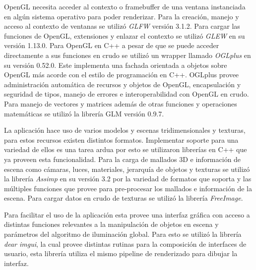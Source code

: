 OpenGL necesita acceder al contexto o framebuffer de una ventana instanciada en algún sistema operativo para poder renderizar. Para la creación, manejo y acceso al contexto de ventanas se utilizó \emph{GLFW} versión 3.1.2. Para cargar las funciones de OpenGL, extensiones y enlazar el contexto se utilizó \emph{GLEW} en su versión 1.13.0. Para OpenGL en C++ a pesar de que se puede acceder directamente a sus funciones en crudo se utilizó un wrapper llamado \emph{OGLplus} en su versión 0.52.0. Este implementa una fachada orientada a objetos sobre OpenGL más acorde con el estilo de programación en C++. OGLplus provee administración automática de recursos y objetos de OpenGL, encapsulación y seguridad de tipos, manejo de errores e interoperabilidad con OpenGL en crudo. Para manejo de vectores y matrices además de otras funciones y operaciones matemáticas se utilizó la librería GLM versión 0.9.7.

La aplicación hace uso de varios modelos y escenas tridimensionales y texturas, para estos recursos existen distintos formatos. Implementar soporte para una variedad de ellos es una tarea ardua por esto se utilizaron librerías en C++ que ya proveen esta funcionalidad. Para la carga de mallados 3D e información de escena como cámaras, luces, materiales, jerarquía de objetos y texturas se utilizó la librería \emph{Assimp} en su versión 3.2 por la variedad de formatos que soporta y las múltiples funciones que provee para pre-procesar los mallados e información de la escena. Para cargar datos en crudo de texturas se utilizó la librería \emph{FreeImage}.

Para facilitar el uso de la aplicación esta provee una interfaz gráfica con acceso a distintas funciones relevantes a la manipulación de objetos en escena y parámetros del algoritmo de iluminación global. Para esto se utilizó la librería \emph{dear imgui}, la cual provee distintas rutinas para la composición de interfaces de usuario, esta librería utiliza el mismo pipeline de renderizado para dibujar la interfaz.

